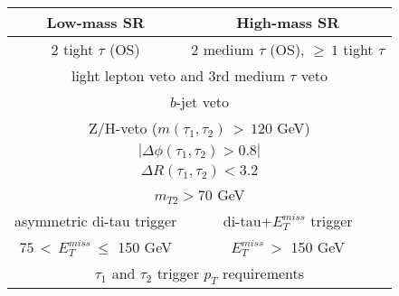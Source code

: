 %
\begin{tabular}{cc}
\hline 
Low-mass SR & High-mass SR \\ \hline \hline
\multicolumn{1}{c|}{2 tight $\tau$ (OS)} & 2 medium $\tau$ (OS), $\geq\,1$ tight $\tau$ \\
\multicolumn{2}{c}{light lepton veto and 3rd medium $\tau$ veto} \\
\multicolumn{2}{c}{$b$-jet veto} \\
\multicolumn{2}{c}{Z/H-veto ($m(\tau_1,\tau_2)\,>\,120$ GeV)} \\
\multicolumn{2}{c}{$|\Delta\phi(\tau_1,\tau_2)>0.8|$} \\
\multicolumn{2}{c}{$\Delta R(\tau_1,\tau_2)<3.2$} \\
\multicolumn{2}{c}{$m_{T2}>70$ GeV} \\  
\multicolumn{1}{c|}{asymmetric di-tau trigger} & di-tau+$E_T^{miss}$ trigger \\
\multicolumn{1}{c|}{$75\,<\,E_T^{miss}\,\leq$ 150 GeV} & $E_T^{miss}\,>$ 150 GeV \\
\multicolumn{2}{c}{$\tau_1$ and $\tau_2$ trigger $p_T$ requirements} \\ \hline
\end{tabular}

%
%
